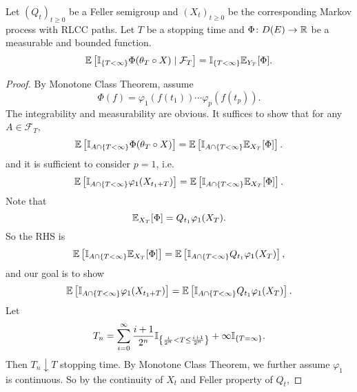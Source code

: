 \begin{thm}
    Let $(Q_t)_{t \geq 0}$ be a Feller semigroup and $(X_t)_{t \geq 0}$ be the corresponding Markov process with RLCC paths. Let $T$ be a stopping time and $\Phi \colon D(E) \rightarrow \mathbb{R}$ be a measurable and bounded function. 
    \begin{equation*}
        \mathbb{E}\left[ \mathbb{I}_{\left\{T < \infty\right\}}\Phi(\theta_T \circ X) \mid \mathcal{F}_T \right] = \mathbb{I}_{\left\{T < \infty\right\}} \mathbb{E}_{Y_T}[\Phi].
    \end{equation*}
\end{thm}
\begin{proof}
    By Monotone Class Theorem, assume 
    \begin{equation*}
        \Phi(f) = \varphi_1(f(t_1))\cdots \varphi_p(f(t_p)).
    \end{equation*}
    The integrability and measurability are obvious. It suffices to show that for any $A \in \mathcal{F}_T$,
    \begin{equation*}
        \mathbb{E}\left[\mathbb{I}_{A \cap \left\{T < \infty\right\}} \Phi(\theta_T \circ X)\right] = \mathbb{E}\left[\mathbb{I}_{A \cap \left\{T < \infty\right\}} \mathbb{E}_{X_T}[\Phi]\right].
    \end{equation*}
    and it is sufficient to consider $p = 1$, i.e.
    \begin{equation*}
        \mathbb{E}\left[\mathbb{I}_{A \cap \left\{T < \infty\right\}}\varphi_1(X_{t_1 + T})\right] = \mathbb{E}\left[\mathbb{I}_{A \cap \left\{T < \infty\right\}} \mathbb{E}_{X_T}[\Phi]\right].
    \end{equation*}
    Note that
    \begin{equation*}
         \mathbb{E}_{X_T}[\Phi]  = Q_{t_1}\varphi_1(X_T).
    \end{equation*}
    So the RHS is
    \begin{equation*}
        \mathbb{E}\left[\mathbb{I}_{A \cap \left\{T < \infty\right\}} \mathbb{E}_{X_T}[\Phi]\right] = \mathbb{E}\left[\mathbb{I}_{A \cap \left\{T < \infty\right\}} Q_{t_1}\varphi_1(X_T)\right],
    \end{equation*}
    and our goal is to show
    \begin{equation*}
        \mathbb{E}\left[\mathbb{I}_{A \cap \left\{T < \infty\right\}}\varphi_1(X_{t_1 + T})\right] = \mathbb{E}\left[\mathbb{I}_{A \cap \left\{T < \infty\right\}} Q_{t_1}\varphi_1(X_T)\right].
    \end{equation*}
    Let
    \begin{equation*}
        T_n = \sum_{i=0}^\infty \frac{i+1}{2^n} \mathbb{I}_{\left\{\frac{i}{2^n} < T \leq \frac{i+1}{2^n}\right\}} + \infty \mathbb{I}_{\left\{T = \infty\right\}}.
    \end{equation*}
    Then $T_n \downarrow T$ stopping time. By Monotone Class Theorem, we further assume $\varphi_1$ is continuous. So by the continuity of $X_t$ and Feller property of $Q_t$,

\end{proof}
